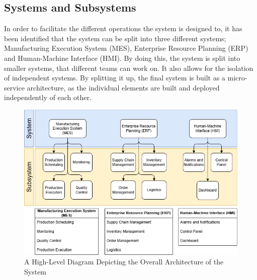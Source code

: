 



\subsection{Systems and Subsystems} %
\label{sec:systems-and-subsystems}

In order to facilitate the different operations the system is designed to, it has been identified that the system can be split into three different systems; Manufacturing Execution System (MES), Enterprise Resource Planning (ERP) and Human-Machine Interface (HMI). 
By doing this, the system is split into smaller systems, that different teams can work on. It also allows for the isolation of independent systems. 
By splitting it up, the final system is built as a micro-service architecture, as the individual elements are built and deployed independently of each other.

\begin{figure}[H]
    \centering
    \caption{\centering A High-Level Diagram Depicting the Overall Architecture of the System}
    \label{fig:systems_and_subsystems-system_diagram}
    \includegraphics[width=1\linewidth]{images/Systems&Subsystems.png}
\end{figure}


